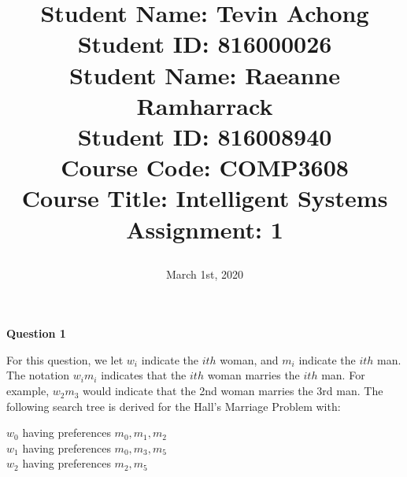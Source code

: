\documentclass[a4paper, 12pt]{article}
\begin{document}
\title{
		\textbf{Student Name:} Tevin Achong\\
		\textbf{Student ID:} 816000026\\
		\textbf{Student Name:} Raeanne Ramharrack\\
		\textbf{Student ID:} 816008940\\						
		\textbf{Course Code:} COMP3608\\
		\textbf{Course Title:} Intelligent Systems\\
		\textbf{Assignment:} 1
		\date{March 1st, 2020}
}
\maketitle

\newpage
{}

\begin{center}
	\textbf{Question 1}
\end{center}
For this question, we let $w_i$ indicate the $ith$ woman, and $m_i$ indicate the $ith$ man. The notation $w_im_i$ indicates that the $ith$ woman marries the $ith$ man. For example, $w_2m_3$ would indicate that the 2nd woman marries the 3rd man. The following search tree is derived for the Hall's Marriage Problem with:
\begin{center}
$w_0$ having preferences $m_0, m_1, m_2$\\
$w_1$ having preferences $m_0, m_3, m_5$\\
$w_2$ having preferences $m_2, m_5$
\end{center}


\begin{adjustbox}{width=\linewidth}
\end{adjustbox}
\end{document}
